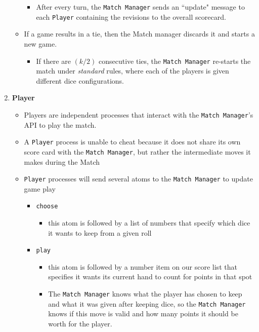 \documentclass[12pt]{article}
\begin{document}
\begin{enumerate}
\begin{itemize}
\begin{itemize}
	\item After every turn, the \texttt{Match Manager} sends an ``update" message to each \texttt{Player} containing the revisions to the overall scorecard.
	\end{itemize}
	\item If a game results in a tie, then the Match manager discards it and starts a new game.
	\begin{itemize}
		\item If there are $(k/2)$ consecutive ties, the \texttt{Match Manager} re-starts the match under \emph{standard} rules, where each of the players is given different dice configurations.
	\end{itemize}
\end{itemize}

\item \textbf{Player}
\begin{itemize}
	\item Players are independent processes that interact with the \texttt{Match Manager}'s API to play the match.
	\item A \texttt{Player} process is unable to cheat because it does not share its own score card with the \texttt{Match Manager}, but rather the intermediate moves it makes during the Match
	\item \texttt{Player} processes will send several atoms to the \texttt{Match Manager} to update game play
	\begin{itemize}
		\item \texttt{choose}
		\begin{itemize}
			\item this atom is followed by a list of numbers that specify which dice it wants to keep from a given roll
		\end{itemize}
		\item \texttt{play}
		\begin{itemize}
			\item this atom is followed by a number item on our score list that specifies it wants its current hand to count for points in that spot
			\item The \texttt{Match Manager} knows what the player has chosen to keep and what it was given after keeping dice, so the \texttt{Match Manager} knows if this move is valid and how many points it should be worth for the player.
		\end{itemize}
	\end{itemize}
\end{itemize}
\end{enumerate}
\end{document}
